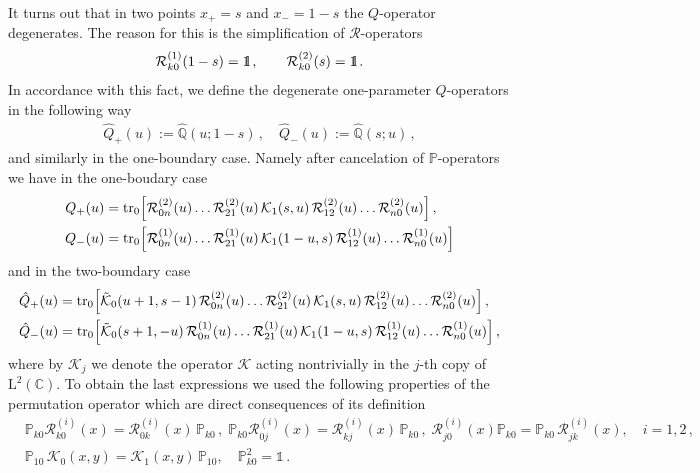 \documentclass[a4paper,11pt]{article}
\newcommand{\tr}{\mathop{\rm tr}\nolimits}
\def\II{\hbox{{1}\kern-.25em\hbox{l}}}
\numberwithin{equation}{section}
\begin{document}
It turns out that in two points $x_+ = s$ and $x_- = 1-s$ the $Q$-operator degenerates.
The reason for this is the simplification of $\mathcal{R}$-operators
\begin{align}
	\mathcal{R}^{(1)}_{k0}(1-s) = \II \,, \qquad
	\mathcal{R}^{(2)}_{k0}(s) = \II \,.
\end{align}	
In accordance with this fact, we define the degenerate one-parameter $Q$-operators in the following way
\begin{align}
	\hat{Q}_+(u):=\hat{\mathbb{Q}}(u;1-s) \,, \quad \hat{Q}_-(u):=\hat{\mathbb{Q}}(s;u) \,,
\end{align}	
and similarly in the one-boundary case.
Namely after cancelation of $\mathbb{P}$-operators we have in the one-boudary case
\begin{align}
	\nonumber
	Q_+(u) & = \tr_{0}\Bigl[\mathcal{R}^{(2)}_{0n}(u)\ldots\mathcal{R}^{(2)}_{21}(u)\,\mathcal{K}_1(s,u)\,\mathcal{R}^{(2)}_{12}(u)\ldots\mathcal{R}^{(2)}_{n0}(u)\Bigr] \,, \\
	\label{Q+}
	Q_-(u) & = \tr_{0}\Bigl[\mathcal{R}^{(1)}_{0n}(u)\ldots\mathcal{R}^{(1)}_{21}(u)\,\mathcal{K}_1(1-u,s)\,\mathcal{R}^{(1)}_{12}(u)\ldots\mathcal{R}^{(1)}_{n0}(u)\Bigr]
\end{align}
and in the two-boundary case
\begin{align}
	& \nonumber
	\hat{Q}_+(u)= \tr_{0}\Bigl[\tilde{\mathcal{K}}_0(u+1, s-1)\,\mathcal{R}^{(2)}_{0n}(u)\ldots\mathcal{R}^{(2)}_{21}(u)\,\mathcal{K}_1(s,u)\,\mathcal{R}^{(2)}_{12}(u)\ldots\mathcal{R}^{(2)}_{n0}(u)\Bigr] \,, \\
	& \nonumber
	\hat{Q}_-(u)= \tr_{0}\Bigl[\tilde{\mathcal{K}}_0(s+1, -u)\,\mathcal{R}^{(1)}_{0n}(u)\ldots\mathcal{R}^{(1)}_{21}(u)\,\mathcal{K}_1(1-u,s)\,\mathcal{R}^{(1)}_{12}(u)\ldots\mathcal{R}^{(1)}_{n0}(u)\Bigr] \,,
\end{align}
where by $\mathcal{K}_j$ we denote the operator $\mathcal{K}$ acting nontrivially in the $j$-th copy of $\mathrm{L}^2(\mathbb{C})$.
To obtain the last expressions we used the following properties of the permutation operator which are direct consequences of its definition
\begin{align}
	& \nonumber
	\mathbb{P}_{k0}\mathcal{R}^{(i)}_{k0}(x) = \mathcal{R}^{(i)}_{0k}(x)\,\mathbb{P}_{k0} \,, \;
	\mathbb{P}_{k0}\mathcal{R}^{(i)}_{0j}(x) = \mathcal{R}^{(i)}_{kj}(x)\,\mathbb{P}_{k0} \,, \;
	\mathcal{R}^{(i)}_{j0}(x)\mathbb{P}_{k0} = \mathbb{P}_{k0} \, \mathcal{R}^{(i)}_{jk}(x), \quad
	i=1,2 \,, \\
	& \label{Pprop}
	\mathbb{P}_{10}\,\mathcal{K}_0(x,y) = \mathcal{K}_1(x,y)\,\mathbb{P}_{10}, \quad \mathbb{P}_{k0}^2 = \mathds{1} \,.
\end{align}
\end{document}
